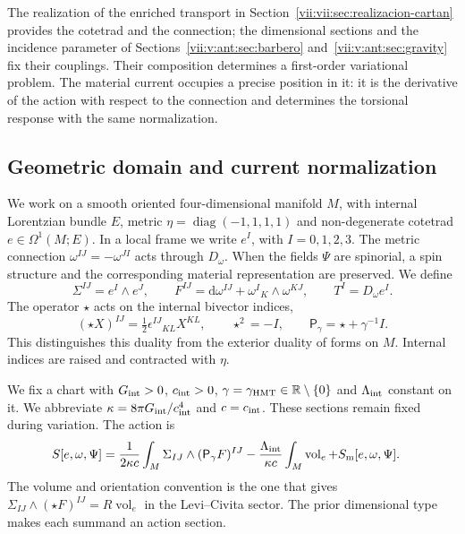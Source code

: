 The realization of the enriched transport in Section~\ref{vii:vii:sec:realizacion-cartan} provides the cotetrad and the connection; the dimensional sections and the incidence parameter of Sections~\ref{vii:v:ant:sec:barbero} and~\ref{vii:v:ant:sec:gravity} fix their couplings. Their composition determines a first-order variational problem. The material current occupies a precise position in it: it is the derivative of the action with respect to the connection and determines the torsional response with the same normalization.

\subsection{Geometric domain and current normalization}
\label{vii:vii:subsec:dominio-corriente-cartan}

We work on a smooth oriented four-dimensional manifold \(M\), with internal Lorentzian bundle \(E\), metric \(\eta=\operatorname{diag}(-1,1,1,1)\) and non-degenerate cotetrad \(e\in\Omega^1(M;E)\). In a local frame we write \(e^I\), with \(I=0,1,2,3\). The metric connection \(\omega^{IJ}=-\omega^{JI}\) acts through \(D_\omega\). When the fields \(\Psi\) are spinorial, a spin structure and the corresponding material representation are preserved. We define
\begin{equation}
 \Sigma^{IJ}=e^I\wedge e^J,\qquad
 F^{IJ}=\mathrm d\omega^{IJ}+\omega^I{}_{K}\wedge\omega^{KJ},
 \qquad T^I=D_\omega e^I.
 \label{vii:vii:eq:campos-cartan}
\end{equation}
The operator \(\star\) acts on the internal bivector indices,
\begin{equation}
 (\star X)^{IJ}=\tfrac12\epsilon^{IJ}{}_{KL}X^{KL},
 \qquad \star^2=-I,\qquad
 \mathsf P_\gamma=\star+\gamma^{-1}I.
 \label{vii:vii:eq:operador-holst}
\end{equation}
This distinguishes this duality from the exterior duality of forms on \(M\). Internal indices are raised and contracted with \(\eta\).

We fix a chart with \(G_{\rm int}>0\), \(c_{\rm int}>0\),
\(\gamma=\gamma_{\rm HMT}\in\mathbb R\setminus\{0\}\) and
\(\Lambda_{\rm int}\) constant on it. We abbreviate
\(\kappa=8\pi G_{\rm int}/c_{\rm int}^4\) and \(c=c_{\rm int}\).
These sections remain fixed during variation. The action is
\begin{equation}
 \begin{split}
 S[e,\omega,\Psi]={}&
 \frac1{2\kappa c}\int_M\Sigma_{IJ}\wedge
                         (\mathsf P_\gamma F)^{IJ}
 -\frac{\Lambda_{\rm int}}{\kappa c}
                         \int_M\operatorname{vol}_e
 +S_{\rm m}[e,\omega,\Psi].
 \end{split}
 \label{vii:vii:eq:accion-cartan-holst}
\end{equation}
The volume and orientation convention is the one that gives \(\Sigma_{IJ}\wedge(\star F)^{IJ}=R\operatorname{vol}_e\) in the Levi--Civita sector. The prior dimensional type makes each summand an action section.

